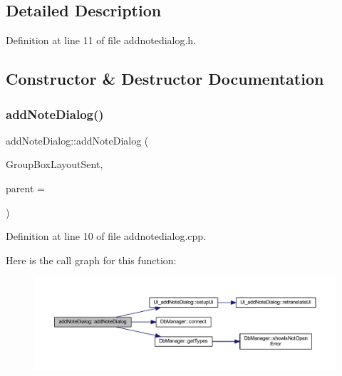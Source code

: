 \subsection{Detailed Description}


Definition at line 11 of file addnotedialog.\+h.



\subsection{Constructor \& Destructor Documentation}
\hypertarget{classaddNoteDialog_afc2d1dcbc9b0e6139859c61606c7f9f1}{}\label{classaddNoteDialog_afc2d1dcbc9b0e6139859c61606c7f9f1} 
\subsubsection{\texorpdfstring{add\+Note\+Dialog()}{addNoteDialog()}}
{\footnotesize\ttfamily add\+Note\+Dialog\+::add\+Note\+Dialog (\begin{DoxyParamCaption}\item[{Q\+V\+Box\+Layout $\ast$}]{Group\+Box\+Layout\+Sent,  }\item[{Q\+Widget $\ast$}]{parent = {} }\end{DoxyParamCaption})}



Definition at line 10 of file addnotedialog.\+cpp.

Here is the call graph for this function\+:
\nopagebreak
\begin{figure}[H]
\begin{center}
\leavevmode
\includegraphics[width=350pt]{classaddNoteDialog_afc2d1dcbc9b0e6139859c61606c7f9f1_cgraph}
\end{center}
\end{figure}
\hypertarget{classaddNoteDialog_a900c8ab72a54252fa03299d821af644f}{}\label{classaddNoteDialog_a900c8ab72a54252fa03299d821af644f} 
